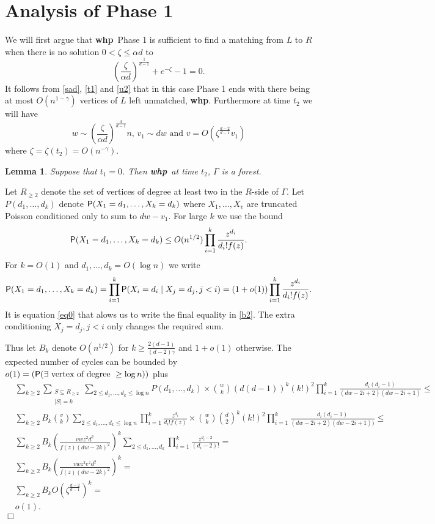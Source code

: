 \documentclass[11pt]{article}
\newenvironment{proof}{{\bf Proof:}}{\hfill\mbox{$\Box$}}
\def\a{\alpha}
\def\g{\gamma}
\def\G{\Gamma}
\def\z{\zeta}
\def\whp{{\bf whp}}
\def\Pr{{\sf P}}
\newtheorem{lemma}[theorem]{Lemma}
\newcommand{\brac}[1]{\left(#1\right)}
\newcommand{\bfrac}[2]{\brac{\frac{#1}{#2}}}
\newcommand{\beq}[1]{\begin{equation}\label{#1}}
\newcommand{\eeq}{\end{equation}}
\begin{document}
\section{Analysis of Phase 1}\label{ap1}
We will first argue that \whp\ Phase 1 is sufficient to find a matching from $L$ to $R$ when there is no solution $0<\z\leq \a d$ to 
\beq{p1e}
\bfrac{\z}{\a d}^{\frac{1}{d-1}} + e^{-\z}-1=0.
\eeq
It follows from \eqref{sad}, \eqref{t1} and \eqref{u2} that in this case Phase 1 ends with there being at most
$O(n^{1-\g})$ vertices of $L$ left unmatched, \whp. Furthermore at time $t_2$ we will have
$$w\sim \bfrac{\z}{\a d}^{\frac{d}{d-1}}n,\,v_1\sim dw\text{ and }v=O(\z^{\frac{d-2}{d-1}}v_1)$$
where $\z=\z(t_2)=O(n^{-\g})$.
\begin{lemma}\label{lemP1}
Suppose that $t_1=0$. Then \whp\ at time $t_2$, $\G$ is a forest.
\end{lemma}
\begin{proof}
Let $R_{\geq 2}$ denote the set of vertices of degree at least two in
the $R$-side of $\G$. 
Let $P(d_1,\ldots,d_k)$ denote $\Pr(X_1=d_1,\ldots,X_k=d_k)$ where $X_1,\ldots,X_v$ are truncated Poisson conditioned
only to sum to $dw-v_1$. For large $k$ we use the bound 
\beq{b1}
\Pr(X_1=d_1,\ldots,X_k=d_k)\leq O(n^{1/2})\prod_{i=1}^k\frac{z^{d_i}}{d_i!f(z)}.
\eeq
For $k=O(1)$ and $d_1,\ldots,d_k=O(\log n)$ we write
\beq{b2}
\Pr(X_1=d_1,\ldots,X_k=d_k)=\prod_{i=1}^k\Pr(X_i=d_i\mid X_j=d_j,j<i)=(1+o(1))\prod_{i=1}^k\frac{z^{d_i}}{d_i!f(z)}.
\eeq
It is equation \eqref{eq0} that alows us to write the final equality in \eqref{b2}. The extra conditioning
$X_j=d_j,j<i$ only changes the required sum.

Thus let $B_k$ denote $O(n^{1/2})$ for $k\geq \frac{2(d-1)}{(d-2)\g}$ and $1+o(1)$ otherwise.
The expected number of cycles can be bounded by $o(1)=(\Pr(\exists\text{ vertex of degree }\geq\log n))$ plus
\begin{align}
&\sum_{k\geq 2}\sum_{\substack{S\subseteq R_{\geq  2}\\|S|=k}}\sum_{2\leq d_1,\ldots,d_k\leq \log n}P(d_1,\ldots,d_k)
\times\binom{w}{k}(d(d-1))^k(k!)^2\prod_{i=1}^k\frac{d_i(d_i-1)}{(dw-2i+2)(dw-2i+1)}\leq \label{cycles}\\
&\sum_{k\geq 2}B_k\binom{v}{k}\sum_{2\leq d_1,\ldots,d_k\leq \log n}\prod_{i=1}^k\frac{z^{d_i}}{d_i!f(z)}
\times\binom{w}{k}\binom{d}{2}^k(k!)^2\prod_{i=1}^k\frac{d_i(d_i-1)}{(dw-2i+2)(dw-2i+1))}\leq \nonumber\\
&\sum_{k\geq 2}B_k\bfrac{vwz^2d^2}{f(z)(dw-2k)^2}^k\sum_{2\leq d_1,\ldots,d_k}\prod_{i=1}^k\frac{z^{d_i-2}}{(d_i-2)!}=
\nonumber\\
&\sum_{k\geq 2}B_k\bfrac{vwz^2e^zd^2}{f(z)(dw-2k)^2}^k=\nonumber\\
&\sum_{k\geq 2}B_kO(\z^{\frac{d-2}{d-1}})^k=\nonumber\\
&o(1).\nonumber
\end{align}
\end{proof}
\end{document}
